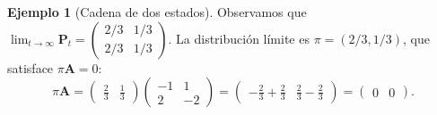 \documentclass{article}
\theoremstyle{plain}
\theoremstyle{definition}
\newtheorem{Ejemplo}[Teorema]{Ejemplo}
\newcommand{\A}{\mathbf{A}}
\newcommand{\PP}{\mathbf{P}}
\begin{document}
\begin{Ejemplo}[Cadena de dos estados]
  Observamos que $\lim_{t\to\infty} \PP_t = \begin{pmatrix} 2/3 & 1/3 \\ 2/3 & 1/3 \end{pmatrix}$. La distribuci\'on l\'imite es $\pi = (2/3, 1/3)$, que satisface $\pi \A = 0$:
  \[ \pi \A = \begin{pmatrix} \frac{2}{3} & \frac{1}{3} \end{pmatrix} \begin{pmatrix} -1 & 1 \\ 2 & -2 \end{pmatrix} = \begin{pmatrix} -\frac{2}{3} + \frac{2}{3} & \frac{2}{3} - \frac{2}{3} \end{pmatrix} = \begin{pmatrix} 0 & 0 \end{pmatrix}. \]
\end{Ejemplo}
\end{document}
